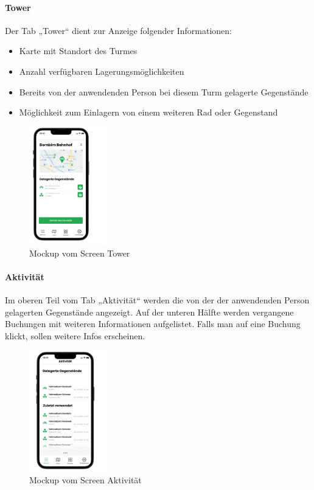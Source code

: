 \paragraph{Tower}Der Tab „Tower“ dient zur Anzeige folgender Informationen:\\
\begin{itemize}
  \item Karte mit Standort des Turmes
  \item Anzahl verfügbaren Lagerungsmöglichkeiten
  \item Bereits von der anwendenden Person bei diesem Turm gelagerte Gegenstände 
  \item Möglichkeit zum Einlagern von einem weiteren Rad oder Gegenstand
\end{itemize}
\begin{figure}[ht]
  \centering
  \includegraphics[width=0.3\textwidth]{images/app_mock_tower}
  \caption{Mockup vom Screen Tower}
  \label{fig:screentower}
\end{figure}

\paragraph{Aktivität}Im oberen Teil vom Tab „Aktivität“ werden die von der der anwendenden Person gelagerten Gegenstände angezeigt. Auf der unteren Hälfte werden vergangene Buchungen mit weiteren Informationen aufgelistet. Falls man auf eine Buchung klickt, sollen weitere Infos erscheinen.\\
\begin{figure}[ht]
  \centering
  \includegraphics[width=0.3\textwidth]{images/app_mock_objects}
  \caption{Mockup vom Screen Aktivität}
  \label{fig:screenactivity}
\end{figure}

